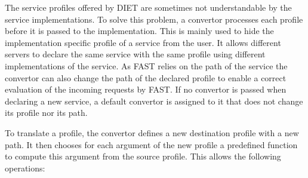 {{The service profiles offered by DIET are sometimes not
understandable by the service implementations. To solve this problem,
a convertor processes each profile before it is passed to the
implementation. This is mainly used to
hide the implementation specific profile of a service from
the user. It allows different servers to declare the same
service with the same profile using different implementations
of the service. As FAST relies on the path of the service the
convertor can also change the path of the declared profile to
enable a correct evaluation of the incoming requests by FAST.
If no convertor is passed when declaring a new service, a
default convertor is assigned to it that does not change its
profile nor its path.

To translate a profile, the convertor defines a new
destination profile with a new path. It then chooses for
each argument of the new profile a predefined function
to compute this argument from the source profile. This
allows the following operations:

}}
